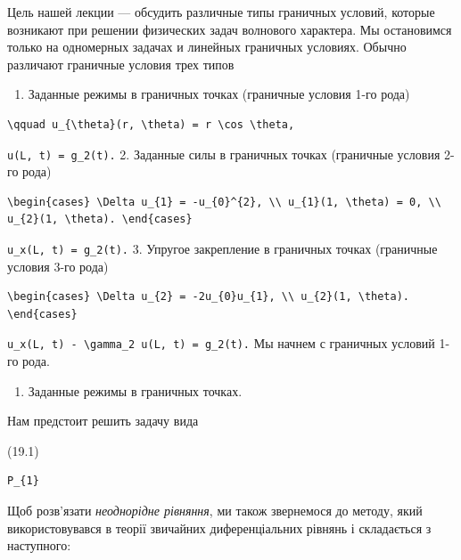 \documentclass[
  ukrainian,
]{article}
\providecommand{\tightlist}{%
  \setlength{\itemsep}{0pt}\setlength{\parskip}{0pt}}
\begin{document}
Цель нашей лекции --- обсудить различные типы граничных условий, которые
возникают при решении физических задач волнового характера. Мы
остановимся только на одномерных задачах и линейных граничных условиях.
Обычно различают граничные условия трех типов

\begin{enumerate}
\def\labelenumi{\arabic{enumi}.}
\tightlist
\item
  Заданные режимы в граничных точках (граничные условия 1-го рода)
\end{enumerate}

\begin{verbatim}
\qquad u_{\theta}(r, \theta) = r \cos \theta,
\end{verbatim}

\texttt{u(L,\ t)\ =\ g\_2(t).} 2. Заданные силы в граничных точках
(граничные условия 2-го рода)

\begin{verbatim}
\begin{cases} \Delta u_{1} = -u_{0}^{2}, \\ u_{1}(1, \theta) = 0, \\ u_{2}(1, \theta). \end{cases}
\end{verbatim}

\texttt{u\_x(L,\ t)\ =\ g\_2(t).} 3. Упругое закрепление в граничных
точках (граничные условия 3-го рода)

\begin{verbatim}
\begin{cases} \Delta u_{2} = -2u_{0}u_{1}, \\ u_{2}(1, \theta). \end{cases}
\end{verbatim}

\texttt{u\_x(L,\ t)\ -\ \textbackslash{}gamma\_2\ u(L,\ t)\ =\ g\_2(t).}
Мы начнем с граничных условий 1-го рода.

\begin{enumerate}
\def\labelenumi{\arabic{enumi}.}
\tightlist
\item
  Заданные режимы в граничных точках.
\end{enumerate}

Нам предстоит решить задачу вида

(19.1)

\begin{verbatim}
P_{1}
\end{verbatim}

Щоб розв'язати \emph{неоднорідне рівняння}, ми також звернемося до
методу, який використовувався в теорії звичайних диференціальних рівнянь
і складається з наступного:
\end{document}
